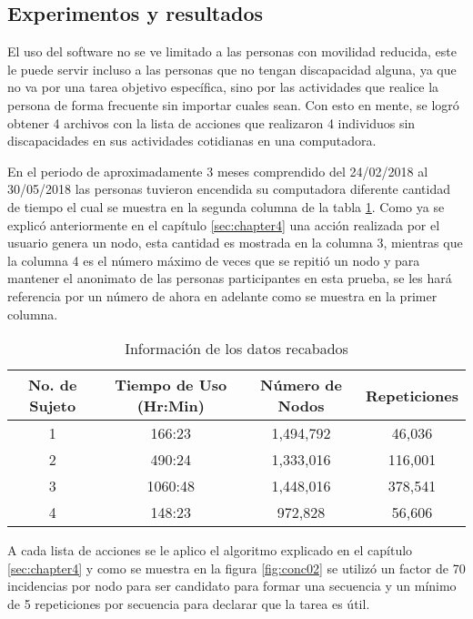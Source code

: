 \subsection{Experimentos y resultados}

El uso del software no se ve limitado a las personas con movilidad reducida, este le puede servir incluso a las personas que no tengan discapacidad alguna, ya que no va por una tarea objetivo espec\'ifica, sino por las actividades que realice la persona de forma frecuente sin importar cuales sean. Con esto en mente, se logr\'o obtener 4 archivos con la lista de acciones que realizaron 4 individuos sin discapacidades en sus actividades cotidianas en una computadora.


En el periodo de aproximadamente 3 meses comprendido del 24/02/2018 al 30/05/2018 las personas tuvieron encendida su computadora diferente cantidad de tiempo el cual se muestra en la segunda columna de la tabla \ref{infodata}. Como ya se explic\'o anteriormente en el cap\'itulo \ref{sec:chapter4} una acci\'on realizada por el usuario genera un nodo, esta cantidad es mostrada en la columna 3, mientras que la columna 4 es el n\'umero m\'aximo de veces que se repiti\'o un nodo y para mantener el anonimato de las personas participantes en esta prueba, se les har\'a referencia por un n\'umero de ahora en adelante como se muestra en la primer columna. 


\begin{table}[]
\centering
\begin{tabular}{cccc}
\hline
		No. de Sujeto	&   Tiempo de Uso (Hr:Min)		&	N\'umero de Nodos	&   Repeticiones 	\\   \hline
		1				&	166:23 						&	1,494,792			&	46,036				\\
		2				&	490:24						&	1,333,016			&	116,001				\\
		3				&	1060:48						&	1,448,016			&	378,541				\\
		4				&	148:23						&	972,828				&	56,606				\\ 
\hline
\end{tabular}
\caption{Informaci\'on de los datos recabados}
\label{infodata}
\end{table}

A cada lista de acciones se le aplico el algoritmo explicado en el cap\'itulo \ref{sec:chapter4} y como se muestra en la figura \ref{fig:conc02} se utiliz\'o un factor de 70 incidencias por nodo para ser candidato para formar una secuencia y un m\'inimo de 5 repeticiones por secuencia para declarar que la tarea es \'util. 


